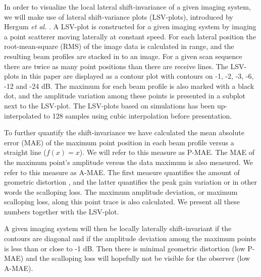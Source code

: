 \documentclass[journal]{IEEEtran}
\begin{document}
In order to visualize the local lateral shift-invariance of a given imaging system, we will make use of lateral shift-variance plots (LSV-plots), introduced by Hergum \textit{et al.} \cite{Hergum2007}. A LSV-plot is constructed for a given imaging system by imaging a point scatterer moving laterally at constant speed. For each lateral position the root-mean-square (RMS) of the image data is calculated in range, and the resulting beam profiles are stacked in to an image. For a given scan sequence there are twice as many point positions than there are receive lines. The LSV-plots in this paper are displayed as a contour plot with contours on -1, -2, -3, -6, -12 and -24 dB. The maximum for each beam profile is also marked with a black dot, and the amplitude variation among these points is presented in a subplot next to the LSV-plot. The LSV-plots based on simulations has been up-interpolated to 128 samples using cubic interpolation before presentation.

To further quantify the shift-invariance we have calculated the mean absolute error (MAE) of the maximum point position in each beam profile versus a straight line ($f(x)=x$). We will refer to this measure as P-MAE. The MAE of the maximum point's amplitude versus the data maximum is also measured. We refer to this measure as A-MAE. The first measure quantifies the amount of geometric distortion \cite{Hergum2007}, and the latter quantifies the peak gain variation or in other words the scalloping loss. The maximum amplitude deviation, or maximum scalloping loss, along this point trace is also calculated. We present all these numbers together with the LSV-plot.

A given imaging system will then be locally laterally shift-invariant if the contours are diagonal and if the amplitude deviation among the maximum points is less than or close to -1 dB. Then there is minimal geometric distortion (low P-MAE) and the scalloping loss will hopefully not be visible for the observer (low A-MAE). %
\end{document}
